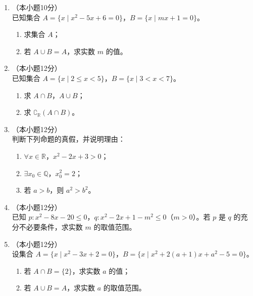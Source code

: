 \documentclass[12pt, a4paper]{ctexart}
\begin{document}
\begin{enumerate}[resume]
\item[17.]（本小题10分）\\
已知集合 $A=\{x\mid x^2-5x+6=0\}$，$B=\{x\mid mx+1=0\}$。
\begin{enumerate}[(1)]
  \item 求集合 $A$；
  \item 若 $A\cup B=A$，求实数 $m$ 的值。
\end{enumerate}

\vspace{6cm}

\item[18.]（本小题12分）\\
已知集合 $A=\{x\mid 2\leq x<5\}$，$B=\{x\mid 3<x<7\}$。
\begin{enumerate}[(1)]
  \item 求 $A\cap B$，$A\cup B$；
  \item 求 $\complement_{\mathbb{R}}(A\cap B)$。
\end{enumerate}

\vspace{6cm}

\item[19.]（本小题12分）\\
判断下列命题的真假，并说明理由：
\begin{enumerate}[(1)]
  \item $\forall x\in\mathbb{R}$，$x^2-2x+3>0$；
  \item $\exists x_0\in\mathbb{Q}$，$x_0^2=2$；
  \item 若 $a>b$，则 $a^2>b^2$。
\end{enumerate}

\vspace{6cm}

\item[20.]（本小题12分）\\
已知 $p: x^2-8x-20\leq 0$，$q: x^2-2x+1-m^2\leq 0$（$m>0$）。若 $p$ 是 $q$ 的充分不必要条件，求实数 $m$ 的取值范围。

\vspace{7cm}

\item[21.]（本小题12分）\\
设集合 $A=\{x\mid x^2-3x+2=0\}$，$B=\{x\mid x^2+2(a+1)x+a^2-5=0\}$。
\begin{enumerate}[(1)]
  \item 若 $A\cap B=\{2\}$，求实数 $a$ 的值；
  \item 若 $A\cup B=A$，求实数 $a$ 的取值范围。
\end{enumerate}


\end{enumerate}
\end{document}
